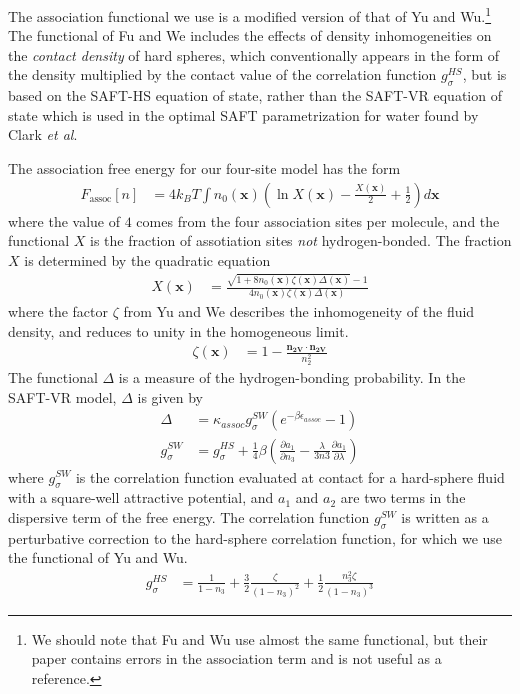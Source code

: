 \documentclass[letterpaper,twocolumn,amsmath,amssymb,prb]{revtex4-1}
\newcommand{\xx}{\textbf{x}}
\begin{document}
The association functional we use is a modified version of that of Yu
and Wu\cite{yu2002fmt-dft-inhomogeneous-associating}.\footnote{We
  should note that Fu and Wu\cite{fu2005vapor-liquid-dft} use almost
  the same functional, but their paper contains errors in the
  association term and is not useful as a reference.}  The functional
of Fu and We includes the effects of density inhomogeneities on the
\emph{contact density} of hard spheres, which conventionally appears
in the form of the density multiplied by the contact value of the
correlation function $g^{HS}_\sigma$, but is based on the SAFT-HS
equation of state\cite{FIXME}, rather than the SAFT-VR equation of
state\cite{gil-villegas-1997-SAFT-VR} which is used in the optimal
SAFT parametrization for water found by Clark \emph{et
  al}\cite{clark2006developing}.

The association free energy for our four-site model has the form
\begin{align}
  F_\text{assoc}[n] &= 4 k_BT \int n_0(\xx)
  \left(\ln X(\xx) - \frac{X(\xx)}{2} + \frac12\right) d\xx
\end{align}
where the value of $4$ comes from the four association sites per
molecule, and the functional $X$ is the fraction of assotiation sites
\emph{not} hydrogen-bonded.  The fraction $X$ is determined by the
quadratic equation
\begin{align}
  X(\xx) &= \frac{\sqrt{1 + 8n_0(\xx)\zeta(\xx)\Delta(\xx)} - 1}
  {4 n_0(\xx)\zeta(\xx)\Delta(\xx)}
\end{align}
where the factor $\zeta$ from
Yu and We\cite{yu2002fmt-dft-inhomogeneous-associating,
  fu2005vapor-liquid-dft} describes the inhomogeneity of the fluid
density, and reduces to unity in the homogeneous limit.
\begin{align}
  \zeta(\xx) &= 1 - \frac{\mathbf{n_{2V}}\cdot\mathbf{n_{2V}}}{n_2^2}
\end{align}
The functional $\Delta$ is a measure of the hydrogen-bonding
probability.  In the SAFT-VR model\cite{gil-villegas-1997-SAFT-VR}, $\Delta$ is
given by
\begin{align}
  \Delta &= \kappa_\textit{assoc} g^\textit{SW}_\sigma
  \left(e^{-\beta\epsilon_\textit{assoc}} - 1\right) \\
  g^\textit{SW}_\sigma &= g^\textit{HS}_\sigma +
  \frac{1}{4}\beta\left(\frac{\partial a_1}{\partial n_3} -
  \frac{\lambda}{3 n3}\frac{\partial a_1}{\partial \lambda}\right)
\end{align}
where $g^\textit{SW}_\sigma$ is the correlation function evaluated at
contact for a hard-sphere fluid with a square-well attractive
potential, and $a_1$ and $a_2$ are two terms in the dispersive term of
the free energy.  The correlation function $g^\textit{SW}_\sigma$ is
written as a perturbative correction to the hard-sphere correlation
function, for which we use the functional of Yu and
Wu.\cite{yu2002fmt-dft-inhomogeneous-associating}
\begin{align}
  g_\sigma^{HS} &= \frac{1}{1-n_3}
  +\frac32\frac{\zeta}{(1-n_3)^2}
  + \frac12\frac{n_3^2\zeta}{(1-n_3)^3}
\end{align}
\end{document}
